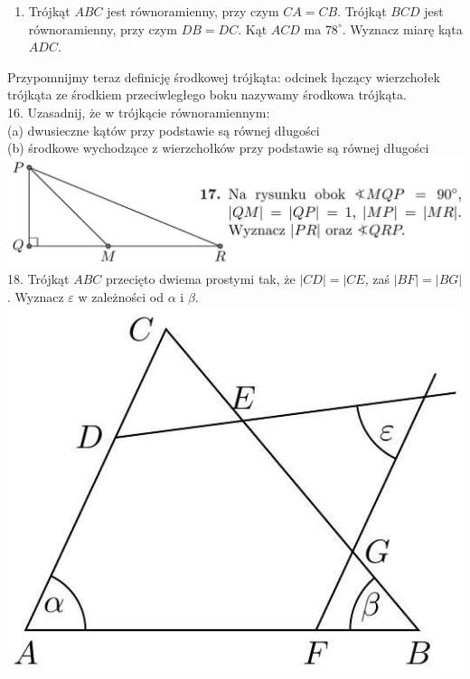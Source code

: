 \documentclass[10pt]{article}
\begin{document}
\begin{enumerate}
  \item Trójkąt \(A B C\) jest równoramienny, przy czym \(C A=C B\). Trójkąt \(B C D\) jest równoramienny, przy czym \(D B=D C\). Kąt \(A C D\) ma \(78^{\circ}\). Wyznacz miarę kąta \(A D C\).
\end{enumerate}

Przypomnijmy teraz definicję środkowej trójkąta: odcinek łączący wierzchołek trójkąta ze środkiem przeciwległego boku nazywamy środkowa trójkąta.\\
16. Uzasadnij, że w trójkącie równoramiennym:\\
(a) dwusieczne kątów przy podstawie są równej długości\\
(b) środkowe wychodzące z wierzchołków przy podstawie są równej długości\\
\includegraphics[max width=\textwidth, center]{2024_11_21_71f62bd117d375398909g-171(1)}\\
18. Trójkąt \(A B C\) przecięto dwiema prostymi tak, że \(|C D|=\mid C E\), zaś \(|B F|=|B G|\). Wyznacz \(\varepsilon\) w zależności od \(\alpha\) i \(\beta\).\\
\includegraphics[max width=\textwidth, center]{2024_11_21_71f62bd117d375398909g-171}\\
\end{document}
